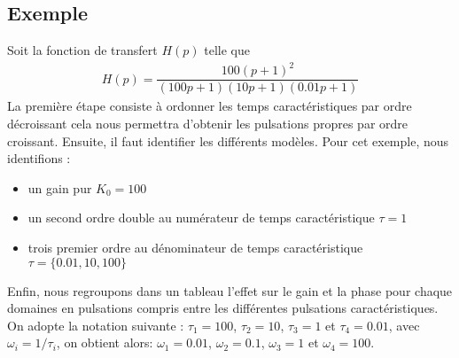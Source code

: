 \subsection*{Exemple}
Soit la fonction de transfert $H(p)$ telle que 
\begin{align}
    H(p) = \dfrac{100(p+1)^2}{(100p+1)(10p+1)(0.01p+1)}\label{eq-ft_qq}
\end{align}
La première étape consiste à ordonner les temps caractéristiques par ordre 
décroissant cela nous permettra d'obtenir les pulsations propres par ordre 
croissant. Ensuite, il faut identifier les différents modèles.
Pour cet exemple, nous identifions :
\begin{itemize}
    \item un gain pur $K_0=100$
    \item un second ordre double au numérateur de temps caractéristique 
          $\tau=1$
    \item trois premier ordre au dénominateur de temps caractéristique 
          $\tau=\{0.01,10,100\}$
\end{itemize}
Enfin, nous regroupons dans un tableau l'effet sur le gain et la phase pour 
chaque domaines en pulsations compris entre les différentes pulsations 
caractéristiques.
On adopte la notation suivante : $\tau_1=100$, $\tau_2=10$, $\tau_3=1$ 
et $\tau_4=0.01$, avec $\omega_i=1/\tau_i$, on obtient alors:
$\omega_1=0.01$, $\omega_2=0.1$, $\omega_3=1$ et $\omega_4=100$.
